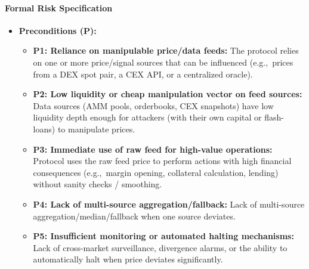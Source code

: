 \paragraph{Formal Risk Specification}

\begin{itemize}
    \item \textbf{Preconditions (P):}
        \begin{itemize}
            \item \textbf{P1: Reliance on manipulable price/data feeds:} The protocol relies on one or more price/signal sources that can be influenced (e.g.,\ prices from a DEX spot pair, a CEX API, or a centralized oracle).
            \item \textbf{P2: Low liquidity or cheap manipulation vector on feed sources:} Data sources (AMM pools, orderbooks, CEX snapshots) have low liquidity depth enough for attackers (with their own capital or flash-loans) to manipulate prices.
            \item \textbf{P3: Immediate use of raw feed for high-value operations:} Protocol uses the raw feed price to perform actions with high financial consequences (e.g.,\ margin opening, collateral calculation, lending) without sanity checks / smoothing.
            \item \textbf{P4: Lack of multi-source aggregation/fallback:} Lack of multi-source aggregation/median/fallback when one source deviates.
            \item \textbf{P5: Insufficient monitoring or automated halting mechanisms:} Lack of cross-market surveillance, divergence alarms, or the ability to automatically halt when price deviates significantly.
        \end{itemize}


\end{itemize}
